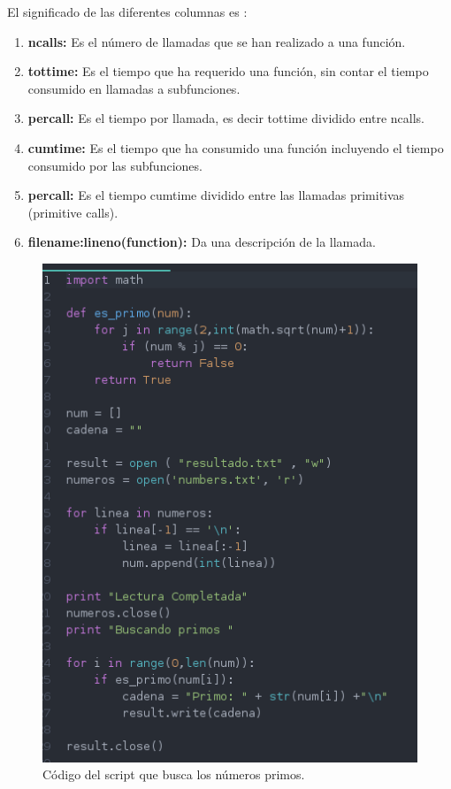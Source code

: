 El significado de las diferentes columnas es \cite{cprofile}:
\begin{enumerate}
  \item \textbf{ncalls:} Es el número de llamadas que se han realizado a una función.
  \item \textbf{tottime:} Es el tiempo que ha requerido una función, sin contar el tiempo consumido en llamadas a subfunciones.
  \item \textbf{percall:} Es el tiempo por llamada, es decir tottime dividido entre ncalls.
  \item \textbf{cumtime:} Es el tiempo que ha consumido una función incluyendo el tiempo consumido por las subfunciones.
  \item \textbf{percall:} Es el tiempo cumtime dividido entre las llamadas primitivas (primitive calls).
  \item \textbf{filename:lineno(function):} Da una descripción de la llamada.
\end{enumerate}

\begin{figure}[H]
  \begin{center}
    \includegraphics[width=1\textwidth]{imagenes/primo}
    \caption{Código del script que busca los números primos.}
    \label{fig20}
  \end{center}
\end{figure}


